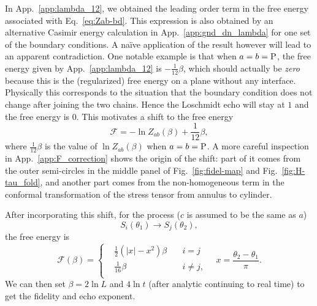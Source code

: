 In App.~\ref{app:lambda_12}, we obtained the leading order term in the free energy associated with Eq.~\eqref{eq:Zab-bd}. This expression is also obtained by an alternative Casimir energy calculation in App.~\ref{app:gnd_dn_lambda} for one set of the boundary conditions. A na\"ive application of the result however will lead to an apparent contradiction. One notable example is that when $a = b  = {\rm P}$, the free energy given by App.~\ref{app:lambda_12} is $- \frac{1}{12}\beta$, which should actually be {\it zero} because this is the (regularized) free energy on a plane without any interface. Physically this corresponds to the situation that the boundary condition does not change after joining the two chains. Hence the Loschmidt echo will stay at $1$ and the free energy is $0$. This motivates a shift to the free energy
\begin{equation}
\mathcal{F} = - \ln Z_{ab} ( \beta ) + \frac{1}{12} \beta ,
\end{equation}
where $\frac{1}{12}\beta$ is the value of $ \ln Z_{ab} ( \beta )$ when $a = b = {\rm P}$. A more careful inspection in App.~\ref{app:F_correction} shows the origin of the shift: part of it comes from the outer semi-circles in the middle panel of Fig.~\ref{fig:fidel-map} and Fig.~\ref{fig:H-tau_fold}, and another part comes from the non-homogeneous term in the conformal transformation of the stress tensor from annulus to cylinder. 

After incorporating this shift, for the process ($c$ is assumed to be the same as $a$)
\begin{equation}
\label{eq:S_i_S_j}
S_i( \theta_1 ) \rightarrow S_j( \theta_2 ) ,
\end{equation}
the free energy is
\begin{equation}
\mathcal{F}( \beta )  = 
\left\lbrace
\begin{aligned}
  &\frac{1}{2}(|x| - x^2 )\beta  \quad &i = j \\
  &\frac{1}{16}\beta   \quad &i \ne j ,  \\
\end{aligned} \right. \quad x = \frac{\theta_2 - \theta_1}{\pi} .
\end{equation}
We can then set $\beta = 2 \ln L$ and $ 4 \ln t$ (after analytic continuing to real time) to get the fidelity and echo exponent. 


